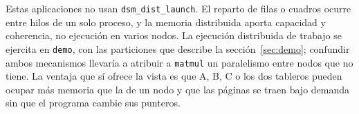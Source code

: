 Estas aplicaciones no usan \texttt{dsm\_dist\_launch}. El reparto de filas o cuadros ocurre entre hilos de un solo proceso, y la memoria distribuida aporta capacidad y coherencia, no ejecución en varios nodos. La ejecución distribuida de trabajo se ejercita en \texttt{demo}, con las particiones que describe la sección~\ref{sec:demo}; confundir ambos mecanismos llevaría a atribuir a \texttt{matmul} un paralelismo entre nodos que no tiene. La ventaja que sí ofrece la vista es que A, B, C o los dos tableros pueden ocupar más memoria que la de un nodo y que las páginas se traen bajo demanda sin que el programa cambie sus punteros.
